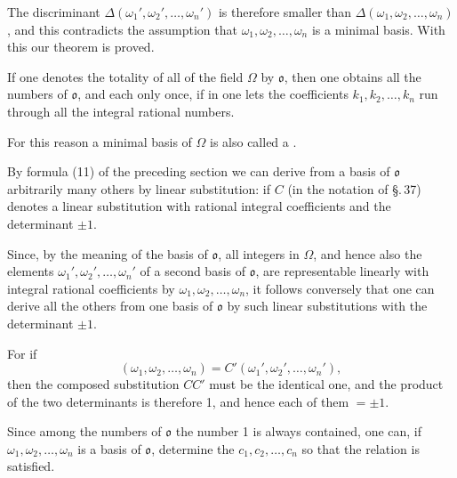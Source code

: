 The discriminant $\varDelta(\omega_1', \omega_2', \ldots, \omega_n')$ is therefore smaller than $\varDelta(\omega_1, \omega_2, \ldots, \omega_n)$, and this contradicts the assumption that $\omega_1, \omega_2, \ldots, \omega_n$ is a minimal basis. With this our theorem is proved.

If one denotes the totality of all  of the field $\Omega$ by $\mathfrak{o}$, then one obtains all the numbers of $\mathfrak{o}$, and each only once, if in
one lets the coefficients $k_1, k_2, \ldots, k_n$ run through all the integral rational numbers.

For this reason a minimal basis of $\Omega$ is also called a .


By formula (11) of the preceding section we can derive from a basis of $\mathfrak{o}$ arbitrarily many others by linear substitution:
if $C$ (in the notation of \S.\,37) denotes a linear substitution with rational integral coefficients and the determinant $\pm 1$.

Since, by the meaning of the basis of $\mathfrak{o}$, all integers in $\Omega$, and hence also the elements $\omega_1', \omega_2', \ldots, \omega_n'$ of a second basis of $\mathfrak{o}$, are representable linearly with integral rational coefficients by $\omega_1, \omega_2, \ldots, \omega_n$, it follows conversely that one can derive all the others from one basis of $\mathfrak{o}$ by such linear substitutions with the determinant $\pm 1$.

For if
\[
(\omega_1, \omega_2, \ldots, \omega_n) = C'(\omega_1', \omega_2', \ldots, \omega_n'),
\]
then the composed substitution $CC'$ must be the identical one, and the product of the two determinants is therefore 1, and hence each of them $= \pm 1$.

Since among the numbers of $\mathfrak{o}$ the number 1 is always contained, one can, if $\omega_1, \omega_2, \ldots, \omega_n$ is a basis of $\mathfrak{o}$, determine the  $c_1, c_2, \ldots, c_n$ so that the relation
is satisfied.
